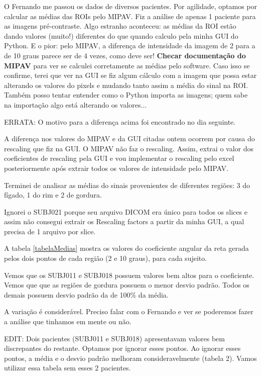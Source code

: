 \documentclass[idxtotoc,hyperref,openany]{labbook} %
\begin{document}
O Fernando me passou os dados de diversos pacientes. Por agilidade, optamos por calcular as médias das ROIs pelo MIPAV. Fiz a análise de apenas 1 paciente para as imagens pré-contraste. Algo estranho aconteceu: as médias da ROI estão dando valores (muito!) diferentes do que quando calculo pela minha GUI do Python. E o pior: pelo MIPAV, a diferença de intensidade da imagem de 2 para a de 10 graus parece ser de 4 vezes, como deve ser! \textbf{Checar documentação do MIPAV} para ver se calculei corretamente as médias pelo software. Caso isso se confirme, terei que ver na GUI se fiz algum cálculo com a imagem que possa estar alterando os valores do pixels e mudando tanto assim a média do sinal na ROI. Também posso tentar entender como o Python importa as imagens; quem sabe na importação algo está alterando os valores...

ERRATA: O motivo para a diferença acima foi encontrado no dia seguinte.



A diferença nos valores do MIPAV e da GUI citadas ontem ocorrem por causa do rescaling que fiz na GUI. O MIPAV não faz o rescaling. Assim, extrai o valor dos coeficientes de rescaling pela GUI e vou implementar o rescaling pelo excel posteriormente após extrair todos os valores de intensidade pelo MIPAV.



Terminei de analisar as médias do sinais provenientes de diferentes regiões: 3 do fígado, 1 do rim e 2 de gordura. 

Ignorei o SUBJ021 porque seu arquivo DICOM era único para todos os slices e assim não consegui extrair os Rescaling factors a partir da minha GUI, a qual precisa de 1 arquivo por slice.

A tabela \ref{tabelaMedias} mostra os valores do coeficiente angular da reta gerada pelos dois pontos de cada região (2 e 10 graus), para cada sujeito. 

Vemos que os SUBJ011 e SUBJ018 possuem valores bem altos para o coeficiente. Vemos que que as regiões de gordura possuem o menor desvio padrão. Todos os demais possuem desvio padrão da de 100\% da média.

A variação é considerável. Preciso falar com o Fernando e ver se poderemos fazer a análise que tinhamos em mente ou não.

EDIT: Dois pacientes (SUBJ011 e SUBJ018) apresentavam valores bem discrepantes do restante. Optamos por ignorar esses pontos. Ao ignorar esses pontos, a média e o desvio padrão melhoram consideravelmente (tabela 2). Vamos utilizar essa tabela sem esses 2 pacientes.
\end{document}
